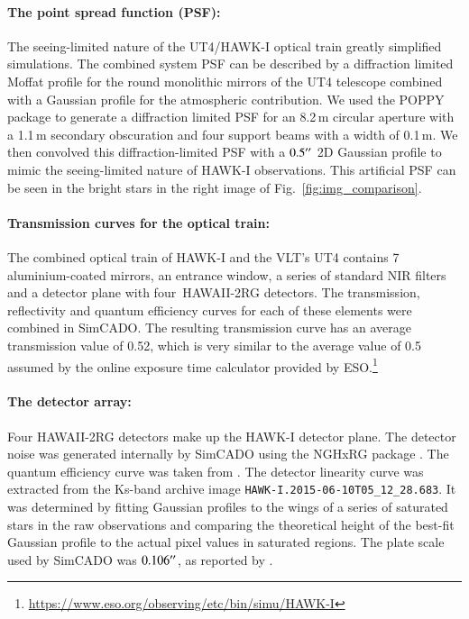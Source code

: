 \paragraph{The point spread function (PSF):}
The seeing-limited nature of the UT4/HAWK-I optical train greatly simplified simulations. The combined system PSF can be described by a diffraction limited Moffat profile for the round monolithic mirrors of the UT4 telescope \citep{vlt_mirror} combined with a Gaussian profile for the atmospheric contribution. We used the POPPY package \citep{poppy} to generate a diffraction limited PSF for an 8.2\,m circular aperture with a 1.1\,m secondary obscuration and four support beams with a width of 0.1\,m. We then convolved this diffraction-limited PSF with a $0.5^{\prime\prime}$ 2D Gaussian profile to mimic the seeing-limited nature of HAWK-I observations. This artificial PSF can be seen in the bright stars in the right image of Fig.~\ref{fig:img_comparison}.

\paragraph{Transmission curves for the optical train:}
The combined optical train of HAWK-I and the VLT's UT4 contains 7 aluminium-coated mirrors, an entrance window, a series of standard NIR filters and a detector plane with four~HAWAII-2RG detectors. The transmission, reflectivity and quantum efficiency curves for each of these elements were combined in SimCADO. The resulting transmission curve has an average transmission value of 0.52, which is very similar to the average value of 0.5 assumed by the online exposure time calculator provided by ESO.\footnote{\url{https://www.eso.org/observing/etc/bin/simu/HAWK-I}}

\paragraph{The detector array:}
Four HAWAII-2RG detectors \citep{hawaii2rg} make up the HAWK-I detector plane. The detector noise was generated internally by SimCADO using the NGHxRG package \citep{nghxrg}. The quantum efficiency curve was taken from \citet{finger2008}. The detector linearity curve was extracted from the Ks-band archive image \verb+HAWK-I.2015-06-10T05_12_28.683+. It was determined by fitting Gaussian profiles to the wings of a series of saturated stars in the raw observations and comparing the theoretical height of the best-fit Gaussian profile to the actual pixel values in saturated regions. The plate scale used by SimCADO was $0.106^{\prime\prime}$, as reported by \citet{hawki}.

